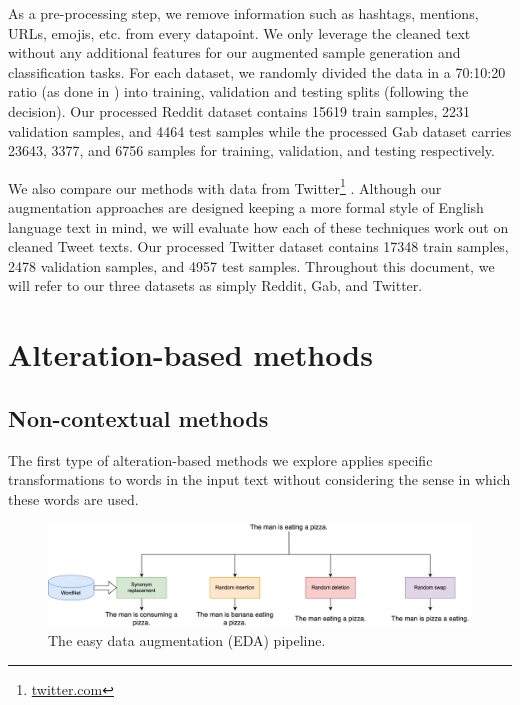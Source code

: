 \documentclass[11pt,a4paper]{article}
\begin{document}
As a pre-processing step, we remove information such as hashtags, mentions, URLs, emojis, etc. from every datapoint. We only leverage the cleaned text without any additional features for our augmented sample generation and classification tasks. For each dataset, we randomly divided the data in a 70:10:20 ratio (as done in \citet{benchmark}) into training, validation and testing splits (following the decision). Our processed Reddit dataset contains 15619 train samples, 2231 validation samples, and 4464 test samples while the processed Gab dataset carries 23643, 3377, and 6756 samples for training, validation, and testing respectively.

We also compare our methods with data from Twitter\footnote{\url{twitter.com}} \cite{gao-huang-2017-detecting}. Although our augmentation approaches are designed keeping a more formal style of English language text in mind, we will evaluate how each of these techniques work out on cleaned Tweet texts. Our processed Twitter dataset contains 17348 train samples, 2478 validation samples, and 4957 test samples. Throughout this document, we will refer to our three datasets as simply Reddit, Gab, and Twitter.

\section{Alteration-based methods}
\subsection{Non-contextual methods}
The first type of alteration-based methods we explore applies specific transformations to words in the input text without considering the sense in which these words are used.

\begin{figure}
    \centering
    \includegraphics[width=\textwidth]{figs/eda.png}
    \caption{The easy data augmentation (EDA) pipeline.}
    \label{fig:eda}
\end{figure}
\end{document}
